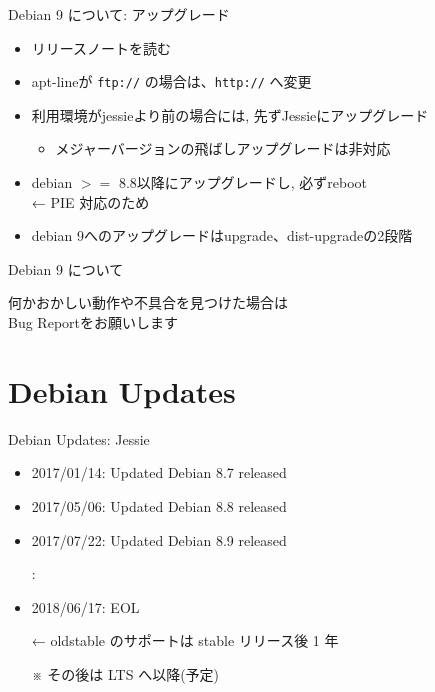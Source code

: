 \documentclass[cjk,c,squeeze,shrink,dvipdfmx,12pt]{beamer}
\begin{document}
\begin{frame}[fragile]{Debian 9 について: アップグレード}%

  \begin{itemize}
  \item \alert{リリースノートを読む}
  \item apt-lineが \texttt{ftp://} の場合は、\texttt{http://} へ変更
  \item 利用環境がjessieより前の場合には, 先ずJessieにアップグレード
    \begin{itemize}
    \item メジャーバージョンの飛ばしアップグレードは非対応
    \end{itemize}
  \item debian $>=$ 8.8以降にアップグレードし, 必ずreboot\\
     ← PIE 対応のため
  \item debian 9へのアップグレードはupgrade、dist-upgradeの2段階
  \end{itemize}
\end{frame}


\begin{frame}[fragile]{Debian 9 について}%
  \Large
  \begin{center}
    何かおかしい動作や不具合を見つけた場合は\\
    Bug Reportをお願いします
  \end{center}
\end{frame}


\section{Debian Updates}


\begin{frame}[fragile]{Debian Updates: Jessie}%
\pause
\begin{itemize}[<+->]
\item 2017/01/14: Updated Debian 8.7 released
\item 2017/05/06: Updated Debian 8.8 released
\item 2017/07/22: Updated Debian 8.9 released
\item[] :
\item \alert{2018/06/17: EOL}
\item[←] oldstable のサポートは stable リリース後 1 年
\item[※] その後は LTS へ以降(予定)
\end{itemize}

\end{frame}
\end{document}
